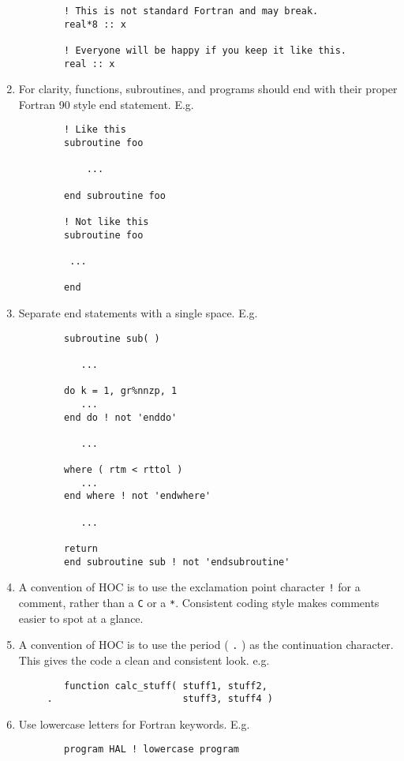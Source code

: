 \documentclass[letterpaper,12pt]{article}
\begin{document}
\begin{enumerate}
\begin{verbatim}
        ! This is not standard Fortran and may break.
        real*8 :: x

        ! Everyone will be happy if you keep it like this.
        real :: x
\end{verbatim}

\item For clarity, functions, subroutines, and programs should end with 
their proper Fortran 90 style end statement. \newline
E.g.
\begin{verbatim}
        ! Like this
        subroutine foo

            ...

        end subroutine foo

        ! Not like this
        subroutine foo

         ...

        end
\end{verbatim}

\item Separate end statements with a single space. \newline 
E.g.
\begin{verbatim}
        subroutine sub( )

           ...

        do k = 1, gr%nnzp, 1
           ...
        end do ! not 'enddo'

           ...

        where ( rtm < rttol )
           ...
        end where ! not 'endwhere'

           ...

        return
        end subroutine sub ! not 'endsubroutine'
\end{verbatim}

\item A convention of HOC is to use the exclamation point character \texttt{!} for a comment, rather than a \texttt{C} or a \texttt{*}.  Consistent coding style makes comments easier to spot at a glance.

\item A convention of HOC is to use the period ( \texttt{.} ) as the 
continuation character.  This gives the code a clean and consistent look.
e.g.
\begin{verbatim}
        function calc_stuff( stuff1, stuff2,
     .                       stuff3, stuff4 )
\end{verbatim}

\item Use lowercase letters for Fortran keywords. \newline
E.g.
\begin{verbatim}
        program HAL ! lowercase program


\end{verbatim}
\end{enumerate}
\end{document}
